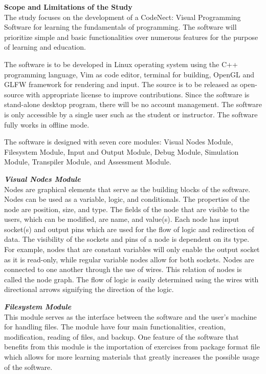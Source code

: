 \flushleft
\textbf{Scope and Limitations of the Study}\\
\justifying
\parx
The study focuses on the development of a CodeNect: Visual Programming Software
for learning the fundamentals of programming. The software will prioritize
simple and basic functionalities over numerous features for the purpose of
learning and education.

The software is to be developed in Linux operating system using the C++ programming
language, Vim as code editor, terminal for building, OpenGL and GLFW framework for
rendering and input.
The source is to be released as open-source with appropriate license to improve
contributions. Since the software is stand-alone desktop program, there will be no
account management. The software is only accessible by a single user such as the
student or instructor.
The software fully works in offline mode.

The software is designed with seven core modules: Visual Nodes Module,
Filesystem Module, Input and Output Module, Debug Module, Simulation Module,
Transpiler Module, and Assessment Module.

\flushleft
\textbf{\textit{Visual Nodes Module}}\\
\justifying
\parx
Nodes are graphical elements that serve as the building blocks of the software.
Nodes can be used as a variable, logic, and conditionals. The properties of the node
are position, size, and type. The fields of the node that are visible to the
users, which can be modified, are name, and value(s). Each node has input
socket(s) and output pins which are used for the flow of logic and redirection
of data. The visibility of the sockets and pins of a node is dependent on its
type.  For example, nodes that are constant variables will only enable the
output socket as it is read-only, while regular variable nodes allow for both
sockets.  Nodes are connected to one another through the use of wires. This
relation of nodes is called the node graph. The flow of logic is easily
determined using the wires with directional arrows signifying the direction of
the logic.

\flushleft
\textbf{\textit{Filesystem Module}}\\
\justifying
\parx
This module serves as the interface between the software and the user's machine for
handling files. The module have four main functionalities, creation, modification,
reading of files, and backup. One feature of the software that benefits from this
module is the importation of exercises from package format file which allows for
more learning materials that greatly increases the possible usage of the software.

